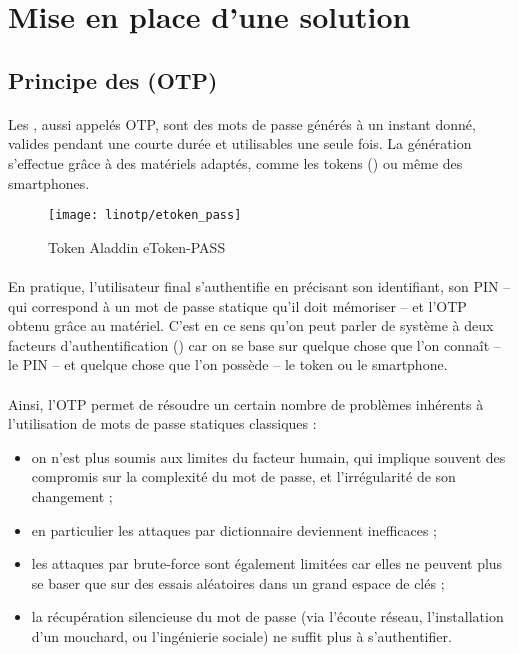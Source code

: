 \section{Mise en place d'une solution \alinotp{}}

\subsection{Principe des  (OTP)}

\paragraph{}
Les , aussi appelés OTP, sont des mots de passe générés à un instant donné, valides pendant une courte durée et utilisables une seule fois.
La génération s'effectue grâce à des matériels adaptés, comme les tokens () ou même des smartphones.

\begin{figure}
	\centering
	\texttt{[image: linotp/etoken\_pass]}
	\caption{Token Aladdin eToken-PASS}
	\label{figure:linotp:token}
\end{figure}

\paragraph{}
En pratique, l'utilisateur final s'authentifie en précisant son identifiant, son PIN -- qui correspond à un mot de passe statique qu'il doit mémoriser -- et l'OTP obtenu grâce au matériel.
C'est en ce sens qu'on peut parler de système à deux facteurs d'authentification () car on se base sur quelque chose que l'on connaît -- le PIN -- et quelque chose que l'on possède -- le token ou le smartphone.

\paragraph{}
Ainsi, l'OTP permet de résoudre un certain nombre de problèmes inhérents à l'utilisation de mots de passe statiques classiques :

\begin{itemize}
	\item on n'est plus soumis aux limites du facteur humain, qui implique souvent des compromis sur la complexité du mot de passe, et l'irrégularité de son changement ;
	\item en particulier les attaques par dictionnaire deviennent inefficaces ;
	\item les attaques par brute-force sont également limitées car elles ne peuvent plus se baser que sur des essais aléatoires dans un grand espace de clés ;
	\item la récupération silencieuse du mot de passe (via l'écoute réseau, l'installation d'un mouchard, ou l'ingénierie sociale) ne suffit plus à s'authentifier.
\end{itemize}

